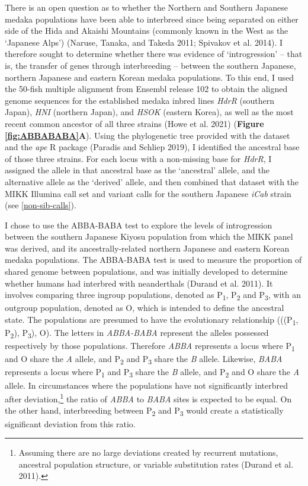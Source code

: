 \documentclass[
]{book}
\begin{document}
There is an open question as to whether the Northern and Southern Japanese medaka populations have been able to interbreed since being separated on either side of the Hida and Akaishi Mountains (commonly known in the West as the `Japanese Alps') (Naruse, Tanaka, and Takeda 2011; Spivakov et al. 2014). I therefore sought to determine whether there was evidence of `introgression' -- that is, the transfer of genes through interbreeding -- between the southern Japanese, northern Japanese and eastern Korean medaka populations. To this end, I used the 50-fish multiple alignment from Ensembl release 102 to obtain the aligned genome sequences for the established medaka inbred lines \emph{HdrR} (southern Japan), \emph{HNI} (northern Japan), and \emph{HSOK} (eastern Korea), as well as the most recent common ancestor of all three strains (Howe et al. 2021) (\textbf{Figure \ref{fig:ABBABABA}A}). Using the phylogenetic tree provided with the dataset and the \emph{ape} R package (Paradis and Schliep 2019), I identified the ancestral base of those three strains. For each locus with a non-missing base for \emph{HdrR}, I assigned the allele in that ancestral base as the `ancestral' allele, and the alternative allele as the `derived' allele, and then combined that dataset with the MIKK Illumina call set and variant calls for the southern Japanese \emph{iCab} strain (see \ref{non-sib-calls}).

I chose to use the ABBA-BABA test to explore the levels of introgression between the southern Japanese Kiyosu population from which the MIKK panel was derived, and its ancestrally-related northern Japanese and eastern Korean medaka populations. The ABBA-BABA test is used to measure the proportion of shared genome between populations, and was initially developed to determine whether humans had interbred with neanderthals (Durand et al. 2011). It involves comparing three ingroup populations, denoted as P\textsubscript{1}, P\textsubscript{2} and P\textsubscript{3}, with an outgroup population, denoted as O, which is intended to define the ancestral state. The populations are presumed to have the evolutionary relationship (((P\textsubscript{1}, P\textsubscript{2}), P\textsubscript{3}), O). The letters in \emph{ABBA-BABA} represent the alleles possessed respectively by those populations. Therefore \emph{ABBA} represents a locus where P\textsubscript{1} and O share the \emph{A} allele, and P\textsubscript{2} and P\textsubscript{3} share the \emph{B} allele. Likewise, \emph{BABA} represents a locus where P\textsubscript{1} and P\textsubscript{3} share the \emph{B} allele, and P\textsubscript{2} and O share the \emph{A} allele. In circumstances where the populations have not significantly interbred after deviation,\footnote{Assuming there are no large deviations created by recurrent mutations, ancestral population structure, or variable substitution rates (Durand et al. 2011).} the ratio of \emph{ABBA} to \emph{BABA} sites is expected to be equal. On the other hand, interbreeding between P\textsubscript{2} and P\textsubscript{3} would create a statistically significant deviation from this ratio.
\end{document}
